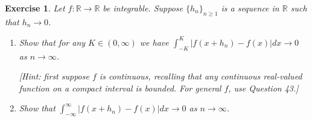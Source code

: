 \documentclass{article}
\newtheorem{exercise}[theorem]{Exercise}
\begin{document}
\begin{exercise}
Let \( f : \mathbb{R} \to \mathbb{R} \) be integrable. Suppose \( \{h_n\}_{n \geq 1} \) is a sequence in \( \mathbb{R} \) such that \( h_n \to 0 \).
    
    \begin{enumerate}
        \item[(a)] Show that for any \( K \in (0, \infty) \) we have \( \int_{-K}^{K} |f(x + h_n) - f(x)|dx \to 0 \) as \( n \to \infty \). 
        
        \textit{[Hint: first suppose \( f \) is continuous, recalling that any continuous real-valued function on a compact interval is bounded. For general \( f \), use Question 43.]}
        
        \item[(b)] Show that \( \int_{-\infty}^{\infty} |f(x + h_n) - f(x)|dx \to 0 \) as \( n \to \infty \).
    \end{enumerate}
\end{exercise}
\end{document}
